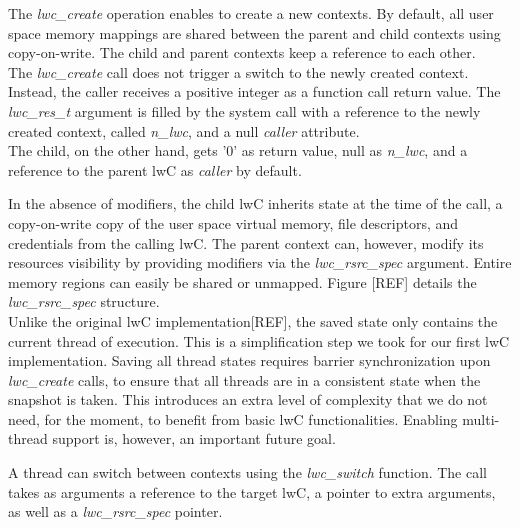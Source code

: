 The \textit{lwc\_create} operation enables to create a new contexts.
By default, all user space memory mappings are shared between the parent and child contexts using copy-on-write.
The child and parent contexts keep a reference to each other.\\
The \emph{lwc\_create} call does not trigger a switch to the newly created context.
Instead, the caller receives a positive integer as a function call return value.
The \emph{lwc\_res\_t} argument is filled by the system call with a reference to the newly created context, called \emph{n\_lwc}, and a null \emph{caller} attribute.\\
The child, on the other hand, gets '0' as return value, null as \emph{n\_lwc}, and a reference to the parent lwC as \emph{caller} by default.

In the absence of modifiers, the child lwC inherits state at the time of the call, a copy-on-write copy of the user space virtual memory, file descriptors, and credentials from the calling lwC.
The parent context can, however, modify its resources visibility by providing modifiers via the \emph{lwc\_rsrc\_spec} argument.
Entire memory regions can easily be shared or unmapped.
Figure [REF] details the \emph{lwc\_rsrc\_spec} structure.\\
Unlike the original lwC implementation[REF], the saved state only contains the current thread of execution.
This is a simplification step we took for our first lwC implementation.
Saving all thread states requires barrier synchronization upon \emph{lwc\_create} calls, to ensure that all threads are in a consistent state when the snapshot is taken.
This introduces an extra level of complexity that we do not need, for the moment, to benefit from basic lwC functionalities.
Enabling multi-thread support is, however, an important future goal.

A thread can switch between contexts using the \emph{lwc\_switch} function.
The call takes as arguments a reference to the target lwC, a pointer to extra arguments, as well as a \emph{lwc\_rsrc\_spec} pointer.





